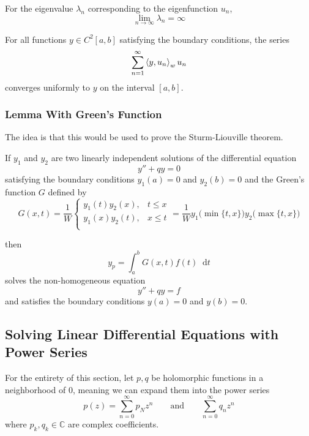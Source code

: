 \documentclass[11pt, a4paper]{article}
\newcommand{\diff}{\mathop{}\!\mathrm{d}} %
\newcommand{\C}{\mathbb{C}} %
\begin{document}
For the eigenvalue $ \lambda_n $ corresponding to the eigenfunction $ u_n $, 
\begin{equation*}
	\lim_{n \to \infty} \lambda_n = \infty
\end{equation*}

For all functions $ y \in C^2[a, b] $ satisfying the boundary conditions, the series
\begin{equation*}
	\sum_{n=1}^{\infty}\expval{y, u_n}_{w}u_n
\end{equation*}
converges uniformly to $ y $ on the interval $ [a, b] $.

\subsubsection{Lemma With Green's Function}
The idea is that this would be used to prove the Sturm-Liouville theorem. 

If $ y_1 $ and $ y_2 $ are two linearly independent solutions of the differential equation
\begin{equation*}
	y'' + qy = 0
\end{equation*}
satisfying the boundary conditions $ y_1(a) = 0 $ and $ y_2(b) = 0 $ and the Green's function $ G $ defined by
\[
	G(x, t) = \frac{1}{W} 
	\begin{cases}
		y_1(t)y_2(x), & t \leq x\\
		y_1(x)y_2(t), & x \leq t\\
	\end{cases}
	= \frac{1}{W} y_1 \big(\min\{t, x\}\big) y_2 \big(\max\{t, x\} \big)
\]

then 
\begin{equation*}
	y_p = \int_{a}^{b} G(x, t) f(t) \diff t
\end{equation*}
solves the non-homogeneous equation
\begin{equation*}
	y'' + qy = f
\end{equation*}
and satisfies the boundary conditions $ y(a) = 0 $ and $ y(b) = 0 $.


\subsection{Solving Linear Differential Equations with Power Series}
For the entirety of this section, let $ p, q  $ be holomorphic functions in a neighborhood of $ 0 $, meaning we can expand them into the power series
\begin{equation*}
	p(z) = \sum_{n= 0}^{\infty} p_N z^n \qquad \text{and} \qquad \sum_{n=0}^{\infty} q_n z^n
\end{equation*}
where $ p_k, q_k \in \C $ are complex coefficients. 
\end{document}
